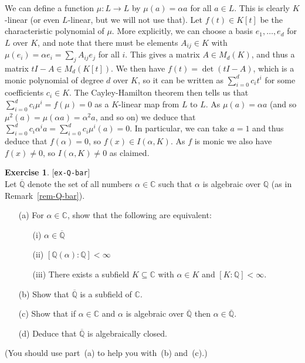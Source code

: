 \documentclass{amsart}
\newcommand{\Q}         {{\mathbb{Q}}}
\newcommand{\C}         {{\mathbb{C}}}
\newcommand{\al}        {\alpha}
\newcommand{\ov}[1]     {\overline{#1}}
\newcommand{\sse}       {\subseteq}
\renewcommand{\:}{\colon}
\newcommand{\lastexlabel}{}
\newcommand{\exlabel}[1]{
 \global\def\lastexlabel{#1}\label{#1}[\texttt{#1}]\ \\
}
\newcommand{\exlabel}[1]{
 \global\def\lastexlabel{#1}\label{#1}
}
\newenvironment{solution}{\SolutionInline}{\endSolutionInline}
\theoremstyle{definition}
\newtheorem{exercise}{Exercise}[section]
\renewenvironment{solution}{\SolutionAtEnd}{\endSolutionAtEnd}
\begin{document}
\begin{solution}
 We can define a function $\mu\:L\to L$ by $\mu(a)=\al a$ for all
 $a\in L$.  This is clearly $K$-linear (or even $L$-linear, but we
 will not use that).  Let $f(t)\in K[t]$ be the characteristic
 polynomial of $\mu$.  More explicitly, we can choose a basis
 $e_1,\dotsc,e_d$ for $L$ over $K$, and note that there must be
 elements $A_{ij}\in K$ with $\mu(e_i)=\al e_i=\sum_jA_{ij}e_j$ for
 all $i$.  This gives a matrix $A\in M_d(K)$, and thus a matrix
 $tI-A\in M_d(K[t])$.  We then have $f(t)=\det(tI-A)$, which is a
 monic polynomial of degree $d$ over $K$, so it can be written as
 $\sum_{i=0}^dc_it^i$ for some coefficients $c_i\in K$.  The
 Cayley-Hamilton theorem then tells us that
 $\sum_{i=0}^dc_i\mu^i=f(\mu)=0$ as a $K$-linear map from $L$ to $L$.
 As $\mu(a)=\al a$ (and so $\mu^2(a)=\mu(\al a)=\al^2 a$, and so on)
 we deduce that $\sum_{i=0}^dc_i\al^ia=\sum_{i=0}^dc_i\mu^i(a)=0$.  In
 particular, we can take $a=1$ and thus deduce that $f(\al)=0$, so
 $f(x)\in I(\al,K)$.  As $f$ is monic we also have $f(x)\neq 0$, so
 $I(\al,K)\neq 0$ as claimed.
\end{solution}
\begin{exercise}\exlabel{ex-Q-bar}
 Let $\ov{\Q}$ denote the set of all numbers $\al\in\C$ such that $\al$
 is algebraic over $\Q$ (as in Remark~\ref{rem-Q-bar}).  
 \begin{itemize}
  \item[(a)] For $\al\in\C$, show that the following are equivalent: 
   \begin{itemize}
    \item[(i)] $\al\in\ov{\Q}$
    \item[(ii)] $[\Q(\al):\Q]<\infty$
    \item[(iii)] There exists a subfield $K\sse\C$ with $\al\in K$ and
     $[K:\Q]<\infty$.
   \end{itemize}
  \item[(b)] Show that $\ov{\Q}$ is a subfield of $\C$.
  \item[(c)] Show that if $\al\in\C$ and $\al$ is algebraic over
   $\ov{\Q}$ then $\al\in\ov{\Q}$.
  \item[(d)] Deduce that $\ov{\Q}$ is algebraically closed.
 \end{itemize}
 (You should use part~(a) to help you with~(b) and~(c).)
\end{exercise}
\end{document}

